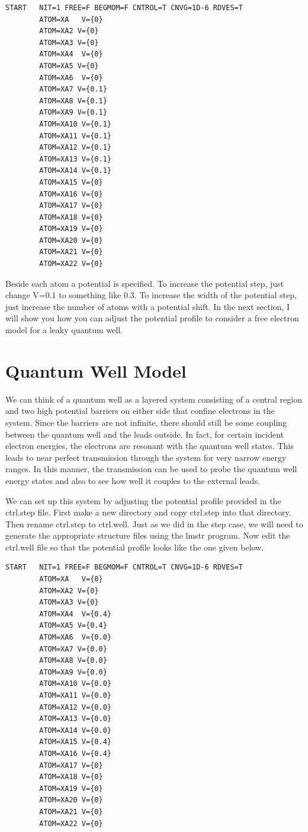 \documentclass[10pt]{article}
\begin{document}
\begin{verbatim}
START   NIT=1 FREE=F BEGMOM=F CNTROL=T CNVG=1D-6 RDVES=T
        ATOM=XA   V={0}
        ATOM=XA2 V={0}
        ATOM=XA3 V={0}
        ATOM=XA4  V={0}
        ATOM=XA5 V={0}
        ATOM=XA6  V={0}
        ATOM=XA7 V={0.1}
        ATOM=XA8 V={0.1}
        ATOM=XA9 V={0.1}
        ATOM=XA10 V={0.1}
        ATOM=XA11 V={0.1}
        ATOM=XA12 V={0.1}
        ATOM=XA13 V={0.1}
        ATOM=XA14 V={0.1}
        ATOM=XA15 V={0}
        ATOM=XA16 V={0}
        ATOM=XA17 V={0}
        ATOM=XA18 V={0}
        ATOM=XA19 V={0}
        ATOM=XA20 V={0}
        ATOM=XA21 V={0}
        ATOM=XA22 V={0}
\end{verbatim}

Beside each atom a potential is specified.  To increase the potential step, just change V=0.1 to something like 0.3.  To increase the width of the potential step, just increase the number of atoms with a potential shift.  In the next section, I will show you how you can adjust the potential profile to consider a free electron model for a leaky quantum well.

\section{Quantum Well Model}

We can think of a quantum well as a layered system consisting of a central region and two high potential barriers on either side that confine electrons in the system.  Since the barriers are not infinite, there should still be some coupling between the quantum well and the leads outside.  In fact, for certain incident electron energies, the electrons are resonant with the quantum well states.  This leads to near perfect transmission through the system for very narrow energy ranges.  In this manner, the transmission can be used to probe the quantum well energy states and also to see how well it couples to the external leads.  

We can set up this system by adjusting the potential profile provided in the ctrl.step file.  First make a new directory and copy ctrl.step into that directory.  Then rename ctrl.step to ctrl.well.  Just as we did in the step case, we will need to generate the appropriate structure files using the lmstr program.  Now edit the ctrl.well file so that the potential profile looks like the one given below.

\begin{verbatim}
START   NIT=1 FREE=F BEGMOM=F CNTROL=T CNVG=1D-6 RDVES=T
        ATOM=XA   V={0}
        ATOM=XA2 V={0}
        ATOM=XA3 V={0}
        ATOM=XA4  V={0.4}
        ATOM=XA5 V={0.4}
        ATOM=XA6  V={0.0}
        ATOM=XA7 V={0.0}
        ATOM=XA8 V={0.0}
        ATOM=XA9 V={0.0}
        ATOM=XA10 V={0.0}
        ATOM=XA11 V={0.0}
        ATOM=XA12 V={0.0}
        ATOM=XA13 V={0.0}
        ATOM=XA14 V={0.0}
        ATOM=XA15 V={0.4}
        ATOM=XA16 V={0.4}
        ATOM=XA17 V={0}
        ATOM=XA18 V={0}
        ATOM=XA19 V={0}
        ATOM=XA20 V={0}
        ATOM=XA21 V={0}
        ATOM=XA22 V={0}
\end{verbatim}
\end{document}
